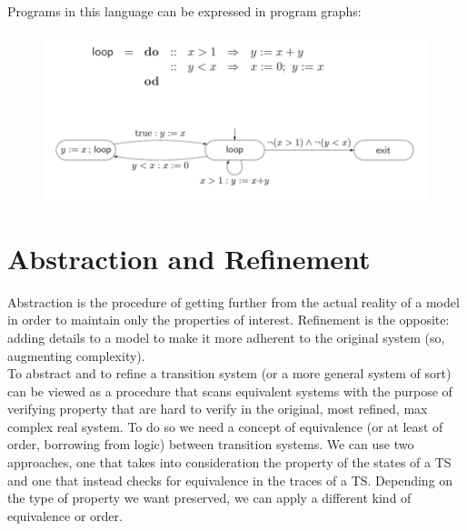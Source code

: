 \documentclass{article}
\begin{document}
					Programs in this language can be expressed in program graphs:
					\begin{figure}[H]
						\centering
						\includegraphics[width = \textwidth]{./images/PromelaGraph.png}
					\end{figure}
					
					
		\section{Abstraction and Refinement}
			Abstraction is the procedure of getting further from the actual reality of a model in order to maintain only the properties of interest. Refinement is the opposite: adding details to a model to make it more adherent to the original system (so, augmenting complexity).\\
			To abstract and to refine a transition system (or a more general system of sort) can be viewed as a procedure that scans equivalent systems with the purpose of verifying property that are hard to verify in the original, most refined, max complex real system. To do so we need a concept of equivalence (or at least of order, borrowing from logic) between transition systems. We can use two approaches, one that takes into consideration the property of the states of a TS and one that instead checks for equivalence in the traces of a TS. Depending on the type of property we want preserved, we can apply a different kind of equivalence or order. 
					
\end{document}
